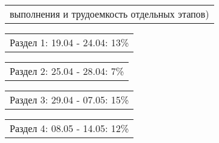 \documentclass[12pt, А4, twoside]{article}
\begin{document}
\begin{FlushLeft}
		\vspace{-0.1 cm}
		
		\begin{tabular}{p{17.25cm}}
			\textsf{выполнения и трудоемкость отдельных этапов)} \vspace{0pt} \hline \\
		\end{tabular}
		
		\vspace{-0.1 cm}
		
		\begin{tabular}{p{17.25cm}} 
			\hspace{0.3cm} \textsf{Раздел 1:} \hspace{2.54cm} \textsf{ 19.04 - 24.04:} \hspace{0.5cm} \textsf{13\%} \vspace{1pt} \hline \\
		\end{tabular} 
		
		\vspace{-0.1 cm}
		
		\begin{tabular}{p{17.25cm}} 
			\hspace{0.3cm} \textsf{Раздел 2:} \hspace{2.54cm} \textsf{ 25.04 - 28.04:} \hspace{0.5cm} \textsf{7\%} \vspace{1pt} \hline \\
		\end{tabular} 
		
		\vspace{-0.1 cm}
		
		\begin{tabular}{p{17.25cm}} 
			\hspace{0.3cm} \textsf{Раздел 3:} \hspace{2.54cm} \textsf{ 29.04 - 07.05:} \hspace{0.5cm} \textsf{15\%} \vspace{1pt} \hline \\
		\end{tabular}
		
		\vspace{-0.1 cm}
		
		\begin{tabular}{p{17.25cm}}  
			\hspace{0.3cm} \textsf{Раздел 4:} \hspace{2.54cm} \textsf{ 08.05 - 14.05:} \hspace{0.5cm} \textsf{12\%} \vspace{1pt} \hline \\
		\end{tabular} 
		

\end{FlushLeft}
\end{document}
